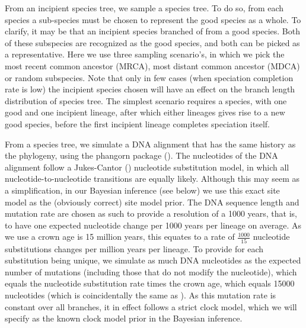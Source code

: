 \documentclass{article}
\begin{document}
From an incipient species tree, we sample a species tree. To do
so, from each species a sub-species must be chosen to represent
the good species as a whole. To clarify, it may be that an
incipient species branched of from a good species. Both of these
subspecies are recognized as the good species, and both can be 
picked as a representative. Here we use three sampling scenario's,
in which we pick the most recent common ancestor (MRCA), 
most distant common ancestor (MDCA) or random subspecies. Note that only in few 
cases (when speciation completion rate is low) the incipient species
chosen will have an effect on the branch length distribution of species 
tree. The simplest scenario requires a species, with one good and
one incipient lineage, after which either lineages gives 
rise to a new good species, before the first incipient lineage
completes speciation itself.

From a species tree, we simulate a DNA alignment that has the same history
as the phylogeny, using the phangorn package (\cite{phangorn}). 
The nucleotides of the DNA alignment follow a Jukes-Cantor (\cite{jc69})
nucleotide substitution model, in which all nucleotide-to-nucleotide transitions
are equally likely. Although this may seem as a simplification, in our Bayesian
inference (see below) we use this exact site model as the (obviously correct) site model prior.
The DNA sequence length and mutation rate are chosen as such to provide a
resolution of a 1000 years, that is, to have one expected nucleotide change 
per 1000 years per lineage on average. As we use a crown age is 15 million years,
this equates to a rate of $\frac{1000}{15}$ nucleotide substitutions 
changes per million years per lineage. To provide for each substitution being unique,
we simulate as much DNA nucleotides as the expected number of mutations (including those
that do not modify the nucleotide), which equals the
nucleotide substitution rate times the crown age, which equals 15000 nucleotides (which is
coincidentally the same as \cite{moller2018}). As this
mutation rate is constant over all branches, it in effect follows a strict 
clock model, which we will specify as the known clock model prior in the Bayesian inference.
\end{document}
